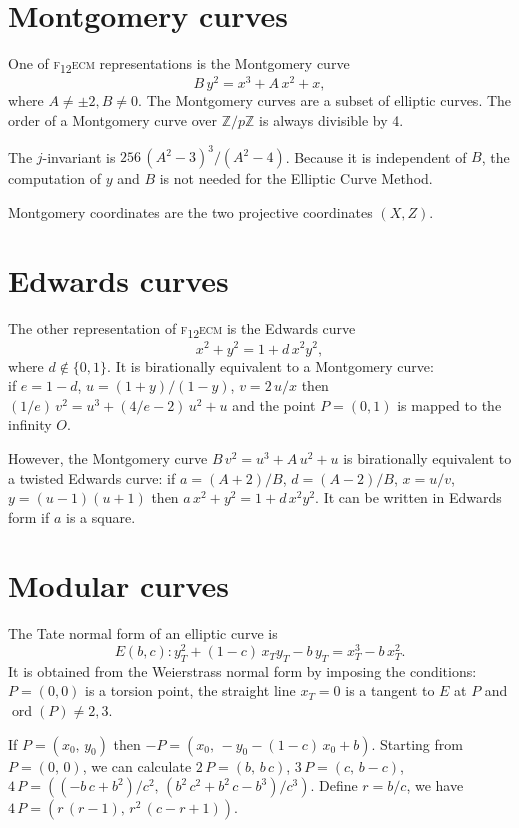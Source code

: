 \documentclass[a4paper, 11pt, pdftex]{report}
\theoremstyle{plain}
\theoremstyle{definition}
\DeclareMathOperator{\ord}{ord}
\begin{document}
\section{Montgomery curves}

One of {\scshape f\textsubscript{12}ecm} representations is the Montgomery curve
$$B\,y^2 = x^3 + A\,x^2 + x,$$
where $A \neq \pm2, B \neq 0$. 
The Montgomery curves are a subset of elliptic curves. The order of a Montgomery curve over
$\mathbb{Z}/p\mathbb{Z}$ is always divisible by 4.

The $j$-invariant is $256\,(A^2 - 3)^3 / (A^2 - 4)$. Because it is independent of $B$,
the computation of $y$ and $B$ is not needed for the Elliptic Curve Method.

Montgomery coordinates are the two projective coordinates $(X, Z)$.

\section{Edwards curves}

The other representation of {\scshape f\textsubscript{12}ecm} is the Edwards curve
$$x^2 + y^2 = 1 + d\,x^2y^2,$$
where $d \not\in \{0, 1\}$. It is birationally equivalent to a Montgomery curve:\\
if $e = 1 - d$, $u = (1 + y)/(1 - y)$, $v = 2\,u / x$ then $(1/e)\,v^2 = u^3 + (4/e - 2)\,u^2 + u$
and the point $P = (0, 1)$ is mapped to the infinity $O$.

However, the Montgomery curve $B\,v^2 = u^3 + A\,u^2 + u$ is birationally equivalent to a
twisted Edwards curve:
if $a = (A + 2) / B$, $d = (A - 2) / B$, $x = u / v$, $y = (u - 1)(u + 1)$ then
$a\,x^2 + y^2 = 1 + d\,x^2y^2$. It can be written in Edwards form if $a$ is a square.

\section{Modular curves}

The Tate normal form of an elliptic curve is
$$E(b, c): y_T^2 + (1 - c)\, x_T y_T - b\,y_T = x_T^3 -  b\, x_T^2.$$
It is  obtained from the  Weierstrass normal form by  imposing the conditions: $P = (0, 0)$ is a
torsion point, the straight line $x_T = 0$ is a tangent to $E$ at $P$ and $\ord(P)\neq 2 ,3$.

If $P = (x_0,\, y_0)$ then $-P = (x_0,\, -y_0 - (1 - c)\, x_0 + b)$.
Starting from $P = (0,\, 0)$, we can calculate
$2\,P = \left(b,\, b\,c\right)$, $3\,P = \left(c,\, b - c\right)$,
$4\,P = \left((-b\,c + b^2)/c^2,\, (b^2\,c^2 + b^2\,c - b^3)/c^3\right)$. Define $r = b/c$,
we have $4\,P = \left(r\,(r - 1),\, r^2\,(c - r + 1)\right)$.
\end{document}
